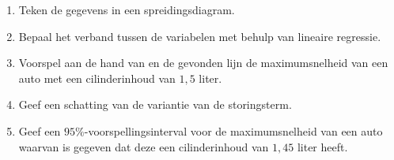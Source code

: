 \begin{enumerate}[label=(\alph*)]
    \item Teken de gegevens in een spreidingsdiagram.
    \answer{

    }

    \item Bepaal het verband tussen de variabelen met behulp van lineaire regressie.
    \answer{

    }

    \item Voorspel aan de hand van en de gevonden lijn de maximumsnelheid van een auto met een cilinderinhoud van $1,5$ liter.
    \answer{
    
    }

    \item Geef een schatting van de variantie van de storingsterm.
    \answer{

    }

    \item Geef een $95\%$-voorspellingsinterval voor de maximumsnelheid van een auto waarvan is gegeven dat deze een cilinderinhoud van $1,45$ liter heeft.
    \answer{

    }
\end{enumerate}